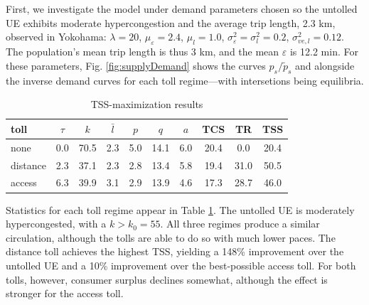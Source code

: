 \documentclass[preprint,authoryear]{elsarticle}
\newcommand{\ve}{\varepsilon}
\begin{document}
First, we investigate the model under demand parameters chosen so the untolled UE exhibits moderate hypercongestion and the average trip length, 2.3 km, observed in Yokohama: $\lambda=20$, $\mu_\ve=2.4$, $\mu_l=1.0$,  $\sigma_\ve^2=\sigma_l^2=0.2$, $\sigma_{ve,l}^2=0.12$. The population's mean trip length is thus 3 km, and the mean $\ve$ is 12.2 min. For these parameters, Fig. \ref{fig:supplyDemand} shows the curves $p_s/\tilde{p}_s$ and alongside the inverse demand curves for each toll regime---with intersetions being equilibria.

\begin{table}
\centering
\begin{tabular}{l||c|c|c|c|c|c|c|c|c}
	toll & $\tau$ & $k$ & $\bar{l}$    & $p$    & $q$     & $a$    & TCS    & TR    & TSS \\ \hline\hline
none   & 0.0 & 70.5 & 2.3 & 5.0 & 14.1 & 6.0 & 20.4 & 0.0  & 20.4 \\ \hline
distance & 2.3 & 37.1 & 2.3 & 2.8 & 13.4 & 5.8 & 19.4 & 31.0 & 50.5 \\ \hline
access   & 6.3 & 39.9 & 3.1 & 2.9 & 13.9 & 4.6 & 17.3 & 28.7 & 46.0 
\end{tabular}
\caption{TSS-maximization results}\label{tab:results}
\end{table}

Statistics for each toll regime appear in Table \ref{tab:results}. The untolled UE is moderately hypercongested, with a $k>k_0=55$. All three regimes produce a similar circulation, although the tolls are able to do so with much lower paces. The distance toll achieves the highest TSS, yielding a 148\% improvement over the untolled UE and a 10\% improvement over the best-possible access toll. For both tolls, however, consumer surplus declines somewhat, although the effect is stronger for the access toll.
\end{document}
